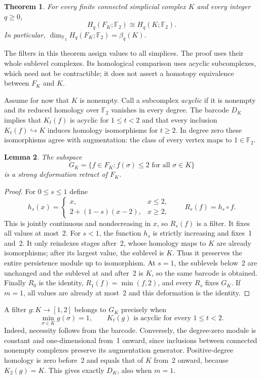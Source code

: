 \documentclass[11pt,a4paper]{article}
\newtheorem{theorem}{Theorem}
\newtheorem{lemma}[theorem]{Lemma}
\newcommand{\F}{\mathbb F_2}
\begin{document}
\begin{theorem}\label{thm:main}
For every finite connected simplicial complex $K$ and every integer $q\geq0$,
\[
 H_q(F_K;\F)\cong H_q(K;\F).
\]
In particular, $\dim_{\F}H_q(F_K;\F)=\beta_q(K)$.
\end{theorem}

The filters in this theorem assign values to all simplices. The proof uses
their whole sublevel complexes. Its homological comparison uses acyclic
subcomplexes, which need not be contractible; it does not assert a homotopy
equivalence between $F_K$ and $K$.

Assume for now that $K$ is nonempty. Call a subcomplex \emph{acyclic} if it
is nonempty and its reduced homology over $\F$ vanishes in every degree.
The barcode $D_K$ implies that $K_t(f)$ is acyclic for $1\leq t<2$ and that
every inclusion $K_t(f)\hookrightarrow K$ induces homology isomorphisms for
$t\geq2$. In degree zero these isomorphisms agree with augmentation: the
class of every vertex maps to $1\in\F$.

\begin{lemma}\label{lem:truncate}
The subspace
\[
 G_K=\{f\in F_K:f(\sigma)\leq2\text{ for all }\sigma\in K\}
\]
is a strong deformation retract of $F_K$.
\end{lemma}

\begin{proof}
For $0\leq s\leq1$ define
\[
 h_s(x)=
 \begin{cases}
 x,&x\leq2,\\
 2+(1-s)(x-2),&x\geq2,
 \end{cases}
 \qquad R_s(f)=h_s\circ f.
\]
This is jointly continuous and nondecreasing in $x$, so $R_s(f)$ is a
filter. It fixes all values at most~2. For $s<1$, the function $h_s$ is
strictly increasing and fixes~1 and~2. It only reindexes stages after~2,
whose homology maps to $K$ are already isomorphisms; after its largest value,
the sublevel is $K$. Thus it preserves the entire persistence module up to
isomorphism. At $s=1$, the sublevels below~2 are unchanged and the sublevel
at and after~2 is $K$, so the same barcode is obtained. Finally $R_0$ is the
identity, $R_1(f)=\min(f,2)$, and every $R_s$ fixes $G_K$. If $m=1$, all
values are already at most~2 and this deformation is the identity.
\end{proof}

A filter $g:K\to[1,2]$ belongs to $G_K$ precisely when
\begin{equation}\label{eq:criterion}
 \min_{\sigma\in K}g(\sigma)=1,
 \qquad K_t(g)\text{ is acyclic for every }1\leq t<2.
\end{equation}
Indeed, necessity follows from the barcode. Conversely, the degree-zero
module is constant and one-dimensional from~1 onward, since inclusions
between connected nonempty complexes preserve its augmentation generator.
Positive-degree homology is zero before~2 and equals that of $K$ from~2
onward, because $K_2(g)=K$. This gives exactly $D_K$, also when $m=1$.
\end{document}
